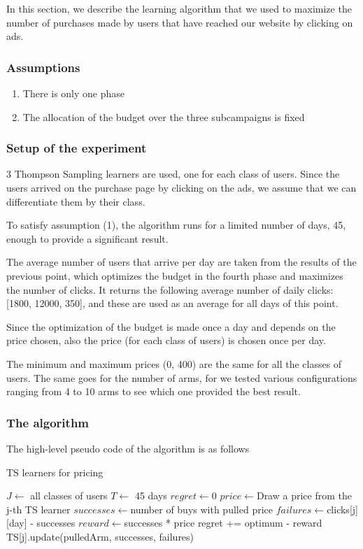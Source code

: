 In this section, we describe the learning algorithm that we used to maximize the number of purchases made by users that have reached our website by clicking on ads.

\subsubsection{Assumptions}
\begin{enumerate}
    \item There is only one phase
    \item The allocation of the budget over the three subcampaigns is fixed
\end{enumerate}

\subsubsection{Setup of the experiment}
3 Thompson Sampling learners are used, one for each class of users. Since the users arrived on the purchase page by clicking on the ads, we assume that we can differentiate them by their class.

To satisfy assumption (1), the algorithm runs for a limited number of days, 45, enough to provide a significant result.

The average number of users that arrive per day are taken from the results of the previous point, which optimizes the budget in the fourth phase and maximizes the number of clicks. It returns the following average number of daily clicks: [1800, 12000, 350], and these are used as an average for all days of this point.

Since the optimization of the budget is made once a day and depends on the price chosen, also the price (for each class of users) is chosen once per day.

The minimum and maximum prices (0, 400) are the same for all the classes of users. The same goes for the number of arms, for we tested various configurations ranging from 4 to 10 arms to see which one provided the best result.

\subsubsection{The algorithm}

The high-level pseudo code of the algorithm is as follows

\begin{algorithm}
	\caption{TS learners for pricing}
	\begin{algorithmic}[1]
        \STATE $J\gets ${ all classes of users}
        \STATE $T\gets ${ 45 days }
        \STATE $regret\gets ${0}
		\STATE $price\gets ${Draw a price from the j-th TS learner}
        \STATE $successes\gets ${number of buys with pulled price}
        \STATE $failures\gets ${clicks[j][day] - successes}
        \STATE $reward\gets ${successes * price}
        \STATE regret += optimum - reward
        \STATE TS[j].update(pulledArm, successes, failures)
        \ENDFOR
        \ENDFOR
	\end{algorithmic}
\end{algorithm}


